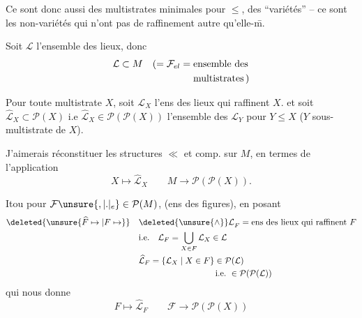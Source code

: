 Ce sont donc aussi des multistrates minimales pour $\leq$,   des ``variétés''  -- ce sont les non-variétés  qui n'ont pas de raffinement autre qu'elle-\={m}.

Soit $\mathcal{L}$ l'ensemble des lieux,  donc
\[
\begin{aligned}
\mathcal{L}\subset M\quad (={}&\mathcal{F}_{el}=\text{ensemble des}\\
&\hphantom{\mathcal{F}_{el}={}}\text{multistrates}\,)
\end{aligned}
\]

 Pour toute multistrate $X$, soit $\mathcal{L}_X$  l'ens des lieux qui raffinent $X$.
et soit $\widehat{\mathcal{L}}_X\subset\mathcal P(X)$ i.e $\widehat{\mathcal{L}}_X\in\mathcal P(\mathcal P(X))$ l'ensemble des  $\mathcal{L}_Y$ pour $Y\leq X$ ($Y$ sous-multistrate de $X$).  

J'aimerais réconstituer les structures $\ll$ et comp. sur $M$, en termes de l'application
\[
 X\longmapsto\widehat{\mathcal{L}}_X\qquad M\longrightarrow\mathcal P(\mathcal P(X)).
\]

 Itou pour $\mathcal F\unsure{,|.|{}_{e}}\in\mathcal P(M)$, (ens des figures), en posant
\[
\begin{aligned}
\deleted{\unsure{\widehat F\mapsto|F\mapsto}}\quad &{\deleted{\unsure{\wedge}}\mathcal{L}}_F=\text{ens des lieux qui raffinent }F\\
 &\text{i.e.}\quad \mathcal{L}_F=\bigcup_{X\in F}\mathcal{L}_X\in \mathcal{L}\\
 &\widehat{\mathcal{L}}_F=\{\mathcal{L}_X\mid X\in F\}\in\mathcal P(\mathcal{L})\\
 &\hspace{9em}\text{i.e.}\ \in\mathcal P(\mathcal P(\mathcal{L}))
\end{aligned}
\]
qui nous donne
\[
 F\longmapsto\widehat{\mathcal{L}}_F\qquad \mathcal F\longrightarrow\mathcal P(\mathcal P(X))
\]

 

